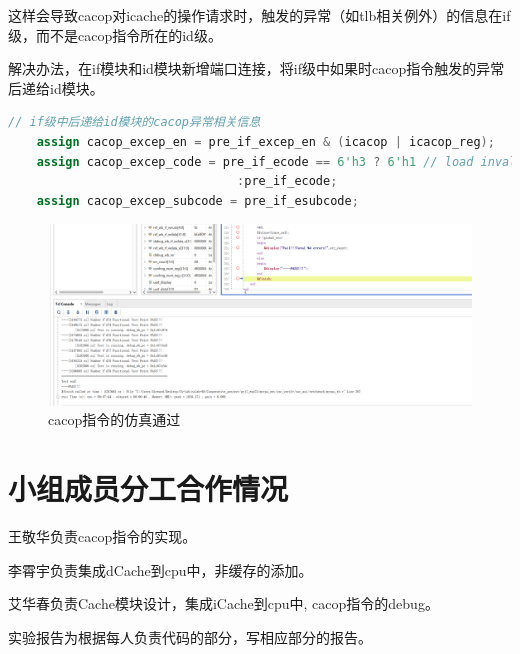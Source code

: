 \documentclass[11pt]{article}
\begin{document}
这样会导致cacop对icache的操作请求时，触发的异常（如tlb相关例外）的信息在if级，而不是cacop指令所在的id级。

解决办法，在if模块和id模块新增端口连接，将if级中如果时cacop指令触发的异常后递给id模块。
\begin{lstlisting}[language=verilog]
    // if级中后递给id模块的cacop异常相关信息
    assign cacop_excep_en = pre_if_excep_en & (icacop | icacop_reg);
    assign cacop_excep_code = pre_if_ecode == 6'h3 ? 6'h1 // load invalid
                                :pre_if_ecode;
    assign cacop_excep_subcode = pre_if_esubcode;
\end{lstlisting}
\begin{figure}[H]
    \centering
    \includegraphics[width=\textwidth]{fig/fig5.png}
    \caption{cacop指令的仿真通过}
    \label{fig:5}
\end{figure} 



\vspace{1ex}

\section{小组成员分工合作情况}
王敬华负责cacop指令的实现。

李霄宇负责集成dCache到cpu中，非缓存的添加。

艾华春负责Cache模块设计，集成iCache到cpu中, cacop指令的debug。

实验报告为根据每人负责代码的部分，写相应部分的报告。
\end{document}
